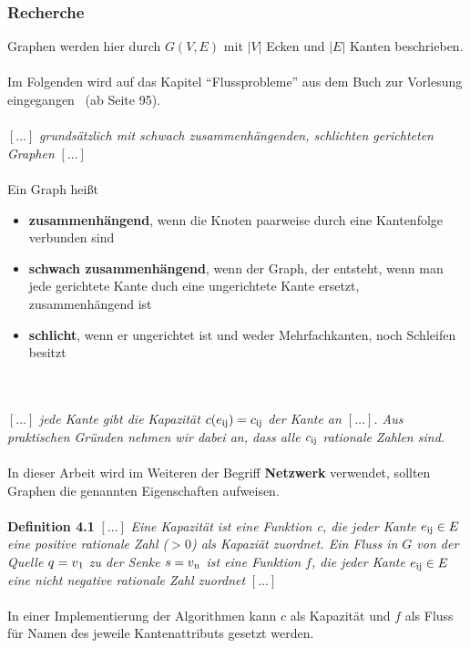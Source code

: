 \documentclass[11pt]{article}
\begin{document}
    \subsubsection{Recherche}
    Graphen werden hier durch $G(V,E)$ mit $|V|$ Ecken und $|E|$ Kanten beschrieben.\\~\\
    Im Folgenden wird auf das Kapitel "`Flussprobleme"' aus dem Buch zur Vorlesung eingegangen~\cite{grbuch} (ab Seite 95).\\~\\
    $[\ldots]$ \textit{grunds\"atzlich mit schwach zusammenh\"angenden, schlichten gerichteten Graphen} $[\ldots]$\\~\\
    Ein Graph hei\ss{}t
    \begin{itemize}
        \item \textbf{zusammenh\"angend}, wenn die Knoten paarweise durch eine Kantenfolge verbunden sind
        \item \textbf{schwach zusammenh\"angend}, wenn der Graph, der entsteht, wenn man jede gerichtete Kante duch eine ungerichtete Kante ersetzt, zusammenh\"angend ist
        \item \textbf{schlicht}, wenn er ungerichtet ist und weder Mehrfachkanten, noch Schleifen besitzt
    \end{itemize}\\~\\
    $[\ldots]$ \textit{jede Kante gibt die Kapazit\"at $c(e\textsubscript{ij})=c\textsubscript{ij}$ der Kante an $[\ldots]$. Aus praktischen Gr\"unden nehmen wir dabei an, dass alle $c\textsubscript{ij}$ rationale Zahlen sind.}\\~\\
    In dieser Arbeit wird im Weiteren der Begriff \textbf{Netzwerk} verwendet, sollten Graphen die genannten Eigenschaften aufweisen.\\~\\
    \textbf{Definition 4.1} $[\ldots]$ \textit{Eine Kapazit\"at ist eine Funktion c, die jeder Kante $e\textsubscript{ij} \in E$  eine positive rationale Zahl ($> 0$) als Kapazi\"at zuordnet. Ein Fluss in $G$ von der Quelle $q = v\textsubscript{1}$ zu der Senke $s = v\textsubscript{n}$ ist eine Funktion $f$, die jeder Kante $e\textsubscript{ij} \in E$ eine nicht negative rationale Zahl zuordnet} $[\ldots]$\\~\\
    In einer Implementierung der Algorithmen kann $c$ als Kapazit\"at und $f$ als Fluss f\"ur Namen des jeweile Kantenattributs gesetzt werden.\\
\end{document}
